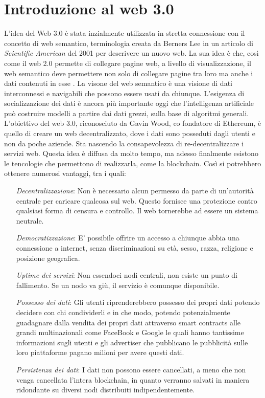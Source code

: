 \section{Introduzione al web 3.0}
L'idea del Web 3.0 è stata inzialmente utilizzata in stretta connessione con il concetto di web semantico, terminologia creata da Berners Lee in un articolo di \textit{Scientific American} del 2001 per descrivere un nuovo web. 
La sua idea è che, così come il web 2.0 permette di collegare pagine web, a livello di visualizzazione, il web semantico deve permettere non solo di collegare pagine tra loro ma anche i dati contenuti in esse \cite{ted_youtube}.
La visone del web semantico è una visione di dati interconnessi e navigabili che possono essere usati da chiunque. L'esigenza di socializzazione dei dati è ancora più importante oggi che l'intelligenza artificiale può costruire modelli a partire dai dati grezzi, sulla base di algoritmi generali.
L'obiettivo del web 3.0, riconosciuto da Gavin Wood, co fondatore di Ethereum, è quello di creare un web decentralizzato, dove i dati sono posseduti dagli utenti e non da poche aziende. Sta nascendo la consapevolezza di re-decentralizzare i servizi web.
Questa idea è diffusa da molto tempo, ma adesso finalmente esistono le tencologie che permettono di realizzarla, come la blockchain.
Così si potrebbero ottenere numerosi vantaggi, tra i quali:
\begin{itemize}
    \item [\textit{Decentralizzazione}:] Non è necessario alcun permesso da parte di un'autorità centrale per caricare qualcosa sul web. Questo fornisce una protezione contro qualsiasi forma di censura e controllo. Il web tornerebbe ad essere un sistema neutrale.
    \item [\textit{Democratizzazione}:] E' possibile offrire un accesso a chiunque abbia una connessione a internet, senza discriminazioni su età, sesso, razza, religione e posizione geografica.
    \item [\textit{Uptime dei servizi}:] Non essendoci nodi centrali, non esiste un punto di fallimento. Se un nodo va giù, il servizio è comunque disponibile.
    \item [\textit{Possesso dei dati}:] Gli utenti riprenderebbero possesso dei propri dati potendo decidere con chi condividerli e in che modo, potendo potenzialmente guadagnare dalla vendita dei propri dati attraverso smart contracts alle grandi multinazionali come FaceBook e Google le quali hanno tantissime informazioni sugli utenti e gli advertiser che pubblicano le pubblicità sulle loro piattaforme pagano milioni per avere questi dati.
    \item [\textit{Persistenza dei dati}:] I dati non possono essere cancellati, a meno che non venga cancellata l'intera blockchain, in quanto verranno salvati in maniera ridondante su diversi nodi distribuiti indipendentemente.
\end{itemize}
